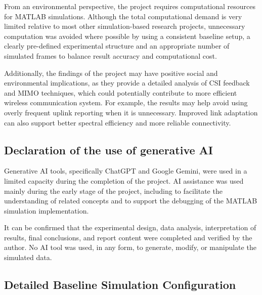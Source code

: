 \documentclass[a4paper,12pt,onecolumn]{article}
\begin{document}
	From an environmental perspective, the project requires computational resources for MATLAB simulations. Although the total computational demand is very limited relative to most other simulation-based research projects, unnecessary computation was avoided where possible by using a consistent baseline setup, a clearly pre-defined experimental structure and an appropriate number of simulated frames to balance result accuracy and computational cost.
	
	Additionally, the findings of the project may have positive social and environmental implications, as they provide a detailed analysis of CSI feedback and MIMO techniques, which could potentially contribute to more efficient wireless communication system. For example, the results may help avoid using overly frequent uplink reporting when it is unnecessary. Improved link adaptation can also support better spectral efficiency and more reliable connectivity.
\subsection{Declaration of the use of generative AI}
	Generative AI tools, specifically ChatGPT and Google Gemini, were used in a limited capacity during the completion of the project. AI assistance was used mainly during the early stage of the project, including to facilitate the understanding of related concepts and to support the debugging of the MATLAB simulation implementation.  
		
	It can be confirmed that the experimental design, data analysis, interpretation of results, final conclusions, and report content were completed and verified by the author. No AI tool was used, in any form, to generate, modify, or manipulate the simulated data.
\newpage
\thispagestyle{empty}
\subsection{Detailed Baseline Simulation Configuration}
\end{document}
